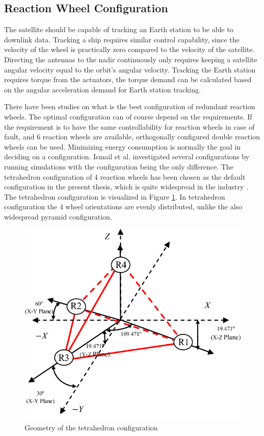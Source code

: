 \subsection{Reaction Wheel Configuration}
\label{ref:reactConfig}

The satellite should be capable of tracking an Earth station to be able to downlink data. Tracking a ship requires similar control capability, since the velocity of the wheel is practically zero compared to the velocity of the satellite. Directing the antennas to the nadir continuously only requires keeping a satellite angular velocity equal to the orbit's angular velocity.
Tracking the Earth station requires torque from the actuators, the torque demand can be calculated based on the angular acceleration demand for Earth station tracking.

There have been studies on what is the best configuration of redundant reaction wheels. The optimal configuration can of course depend on the requirements. If the requirement is to have the same controllability for reaction wheels in case of fault, and 6 reaction wheels are available, orthogonally configured double reaction wheels can be used. Minimizing energy consumption is normally the goal in deciding on a configuration. Ismail et al. \cite{ReactionWheelConfigSim} investigated several configurations by running simulations with the configuration being the only difference. The tetrahedron configuration of 4 reaction wheels has been chosen as the default configuration in the present thesis, which is quite widespread in the industry \cite{reactConfigNasa}. The tetrahedron configuration is visualized in Figure \ref{fig:tetrahedron}.
In tetrahedron configuration the 4 wheel orientations are evenly distributed, unlike the also widespread pyramid configuration. 

\begin{figure}[H]
	\centering 
	\includegraphics[width=120mm]{figures/tetrahedron}	
	\caption{Geometry of the tetrahedron configuration}
	\label{fig:tetrahedron}
\end{figure}

